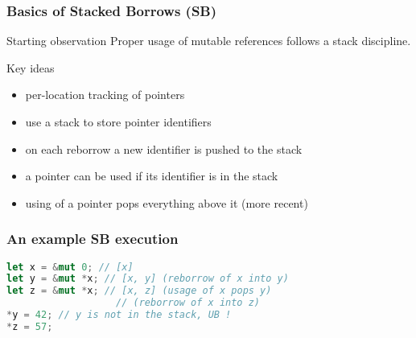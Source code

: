 \begin{frame}
    \frametitle{Basics of Stacked Borrows (SB)}
    \begin{block}{Starting observation}
        Proper usage of mutable references follows a stack discipline.
    \end{block}
    \begin{block}{Key ideas}
        \begin{itemize}
            \item per-location tracking of pointers
            \item use a stack to store pointer identifiers
            \item on each reborrow a new identifier is pushed to the stack
            \item a pointer can be used if its identifier is in the stack
            \item using of a pointer pops everything above it (more recent)
        \end{itemize}
    \end{block}
\end{frame}

\begin{frame}[fragile]
    \frametitle{An example SB execution}
    \begin{block}{}
        \begin{lstlisting}[language=rust]
let x = &mut 0; // [x]
let y = &mut *x; // [x, y] (reborrow of x into y)
let z = &mut *x; // [x, z] (usage of x pops y)
                   // (reborrow of x into z)
*y = 42; // y is not in the stack, UB !
*z = 57;
        \end{lstlisting}
    \end{block}
\end{frame}

